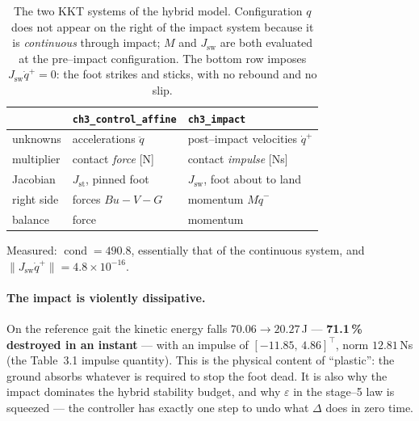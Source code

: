 \documentclass[11pt,a4paper]{article}
\newcommand{\code}[1]{\texttt{#1}}          %
\begin{document}
\begin{table}[h]
\centering
\begin{tabular}{@{}lll@{}}
\toprule
 & \code{ch3\_control\_affine} & \code{ch3\_impact} \\
\midrule
unknowns   & accelerations $\ddot q$      & post--impact velocities $\dot q^{+}$ \\
multiplier & contact \emph{force} [N]     & contact \emph{impulse} [Ns] \\
Jacobian   & $J_{\mathrm{st}}$, pinned foot & $J_{\mathrm{sw}}$, foot about to land \\
right side & forces $Bu-V-G$              & momentum $M\dot q^{-}$ \\
balance    & force                        & momentum \\
\bottomrule
\end{tabular}
\caption{The two KKT systems of the hybrid model. Configuration $q$ does not
appear on the right of the impact system because it is \emph{continuous} through
impact; $M$ and $J_{\mathrm{sw}}$ are both evaluated at the pre--impact
configuration. The bottom row imposes $J_{\mathrm{sw}}\dot q^{+}=0$: the foot
strikes and sticks, with no rebound and no slip.}
\end{table}

Measured: $\operatorname{cond} = 490.8$, essentially that of the continuous
system, and $\lVert J_{\mathrm{sw}}\dot q^{+}\rVert = 4.8\times10^{-16}$.

\paragraph{The impact is violently dissipative.}
On the reference gait the kinetic energy falls
$70.06 \to 20.27\,$J --- \textbf{71.1\,\% destroyed in an instant} --- with an
impulse of $[-11.85,\,4.86]^{\top}$, norm $12.81\,$Ns (the Table~3.1 impulse
quantity). This is the physical content of ``plastic'': the ground absorbs
whatever is required to stop the foot dead. It is also why the impact dominates
the hybrid stability budget, and why $\varepsilon$ in the stage--5 law is
squeezed --- the controller has exactly one step to undo what $\Delta$ does in
zero time.
\end{document}

